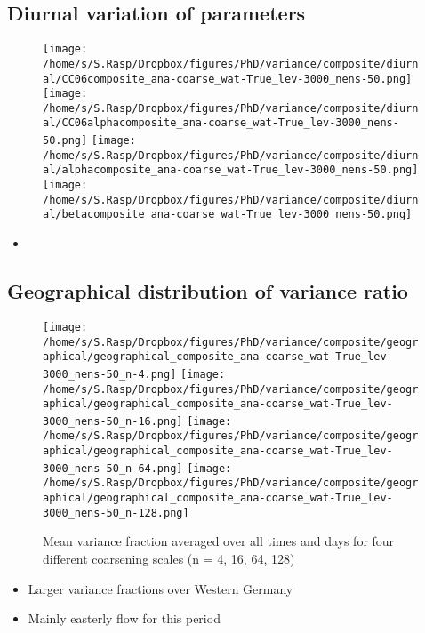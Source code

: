 \documentclass[a4paper, 12pt]{article}
\begin{document}
\subsection{Diurnal variation of parameters}
\begin{figure}[h!]
\noindent \centering
\texttt{[image: /home/s/S.Rasp/Dropbox/figures/PhD/variance/composite/diurnal/CC06composite\_ana-coarse\_wat-True\_lev-3000\_nens-50.png]}
\texttt{[image: /home/s/S.Rasp/Dropbox/figures/PhD/variance/composite/diurnal/CC06alphacomposite\_ana-coarse\_wat-True\_lev-3000\_nens-50.png]}
\texttt{[image: /home/s/S.Rasp/Dropbox/figures/PhD/variance/composite/diurnal/alphacomposite\_ana-coarse\_wat-True\_lev-3000\_nens-50.png]}
\texttt{[image: /home/s/S.Rasp/Dropbox/figures/PhD/variance/composite/diurnal/betacomposite\_ana-coarse\_wat-True\_lev-3000\_nens-50.png]}\\
\caption{} \label{fig:geographical}
\end{figure}
\begin{itemize}
 \item 
\end{itemize}

\newpage



\subsection{Geographical distribution of variance ratio}
\begin{figure}[h!]
\noindent \centering
\texttt{[image: /home/s/S.Rasp/Dropbox/figures/PhD/variance/composite/geographical/geographical\_composite\_ana-coarse\_wat-True\_lev-3000\_nens-50\_n-4.png]}
\texttt{[image: /home/s/S.Rasp/Dropbox/figures/PhD/variance/composite/geographical/geographical\_composite\_ana-coarse\_wat-True\_lev-3000\_nens-50\_n-16.png]}
\texttt{[image: /home/s/S.Rasp/Dropbox/figures/PhD/variance/composite/geographical/geographical\_composite\_ana-coarse\_wat-True\_lev-3000\_nens-50\_n-64.png]}
\texttt{[image: /home/s/S.Rasp/Dropbox/figures/PhD/variance/composite/geographical/geographical\_composite\_ana-coarse\_wat-True\_lev-3000\_nens-50\_n-128.png]}\\
\caption{Mean variance fraction averaged over all times and days for four different coarsening scales (n = 4, 16, 64, 128)} \label{fig:geographical}
\end{figure}
\begin{itemize}
 \item Larger variance fractions over Western Germany
 \item Mainly easterly flow for this period
\end{itemize}
\end{document}
